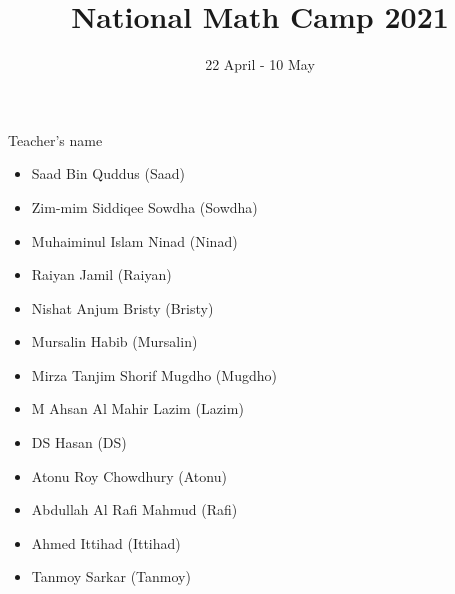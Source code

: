 \documentclass{article}
\begin{document}
	\title{National Math Camp 2021}
	\date{22 April - 10 May}
	\maketitle
	
	Teacher's name 
	\begin{itemize}
		\item Saad Bin Quddus (Saad) 
		\item Zim-mim Siddiqee Sowdha (Sowdha)
		\item Muhaiminul Islam Ninad (Ninad)
		\item Raiyan Jamil (Raiyan)
		\item Nishat Anjum Bristy (Bristy)
		\item Mursalin Habib (Mursalin)
		\item Mirza Tanjim Shorif Mugdho (Mugdho)
		\item M Ahsan Al Mahir Lazim (Lazim)
		\item DS Hasan (DS)
		\item Atonu Roy Chowdhury (Atonu) 
		\item Abdullah Al Rafi Mahmud (Rafi)
		\item Ahmed Ittihad (Ittihad)
		\item Tanmoy Sarkar (Tanmoy)
		
	\end{itemize}
	
\end{document}
